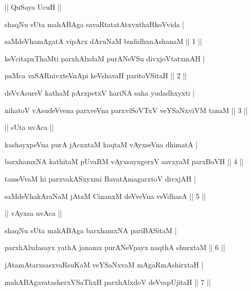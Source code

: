 \documentclass{article}
\begin{document}
 


\begin{sl}
                                                               || QuSaya  UcuH ||
\end{sl}
 
\begin{sl}
shaqNu  sUta  mahABAga  savaRtatatAtxvxthaRkoVvida |  

saMdeVhamAgatA  vipArx  dAruNaM  budidhxnAshanaM              ||   1   ||                     
\end{sl}

  
\begin{sl}
 keVcitapxThaMti  parxhAlxdaM  purANeVSu  divxjoVtatxmAH |
 
 paMca  vaSARnivxteVnApi  keVshavaH  paritoVSitaH             ||  2    ||
\end{sl}

  
\begin{sl}
 deVvAsureV  kathaM  pArxpetxV  hariNA  saha  yudadhxyxti |
 
 nihatoV  vAsudeVvena  parxveVna  parxviSoVTxV  veYSaNxviVM  tanaM  ||   3   ||
\end{sl}
  
\begin{sl}
 ||  sUta  uvAca  ||
\end{sl}
  
\begin{sl}
 kashayxpeVna  purA  jAcnxtaM  kaqtaM  vAyxseVna  dhimatA |
 
 barxhamxNA  kathitaM  pUvaRM  vAyxsayxgerxV  savxyaM  parxBoVH  ||  4   ||    
\end{sl} 
  
\begin{sl}
 tameVvaM  hi  parxvakASxyxmi  BavatAmagarxtoV  divxjAH |
      
 saMdeVhakAraNaM  jAtaM  CinanxM  deVveVna  veVdhasA           ||  5   ||
\end{sl}   
  
  
\begin{sl}
||  vAyxsa  uvAca  ||
\end{sl} 
  
  
\begin{sl}
 shaqNu  sUta  mahABAga  barxhamxNA  pariBASitaM |
 
 parxhAlxdasayx  yathA  janamx  purANeVpayx naqthA  shurxtaM  ||   6   ||
\end{sl}  

  
\begin{sl}
 jAtamAtarxsasxvaRsuKaM  veYSaNxvaM  mAgaRmAshirxtaH |
 
 mahABAgavatasherxVSaThxH  parxhAlxdoV  deVvapUjitaH          ||   7   ||
\end{sl}   
  
\end{document}
